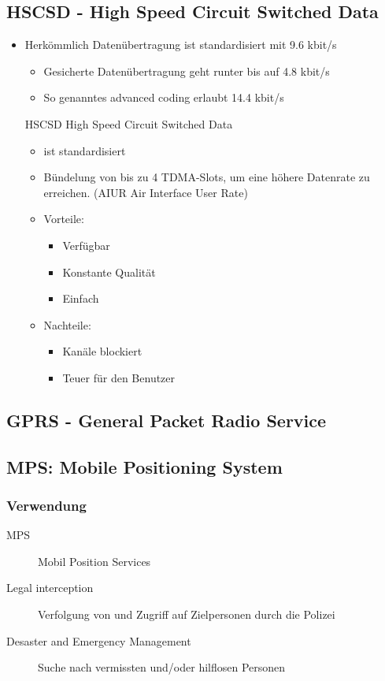 \subsection{HSCSD - High Speed Circuit Switched Data}
\begin{itemize}
\item Herkömmlich Datenübertragung ist standardisiert mit 9.6 kbit/s
\begin{itemize}
\item Gesicherte Datenübertragung geht runter bis auf 4.8 kbit/s
\item So genanntes advanced coding erlaubt 14.4 kbit/s
\end{itemize}
HSCSD High Speed Circuit Switched Data
\begin{itemize}
\item ist standardisiert
\item Bündelung von bis zu 4 TDMA-Slots, um eine höhere Datenrate zu erreichen. (AIUR Air Interface User Rate)
\item Vorteile:
\begin{itemize}
\item Verfügbar
\item Konstante Qualität
\item Einfach
\end{itemize}
\item Nachteile:
\begin{itemize}
\item Kanäle blockiert
\item Teuer für den Benutzer
\end{itemize}
\end{itemize}
\end{itemize}


\subsection{GPRS - General Packet Radio Service}



\subsection{MPS: Mobile Positioning System}

\subsubsection{Verwendung}
\begin{description}
\item [MPS] Mobil Position Services
\item [Legal interception] Verfolgung von und Zugriff auf Zielpersonen durch die Polizei
\item [Desaster and Emergency Management] Suche nach vermissten und/oder hilflosen Personen
\end{description}
\vspace{0.5cm}

